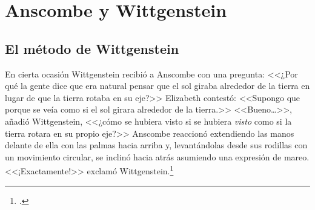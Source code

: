 

\section{Anscombe y Wittgenstein}



\subsection{El método de Wittgenstein}

En cierta ocasión Wittgenstein recibió a Anscombe con una pregunta: <<¿Por qué la
gente dice que era natural pensar que el sol giraba alrededor de la tierra en
lugar de que la tierra rotaba en su eje?>> Elizabeth contestó: <<Supongo que
porque se veía como si el sol girara alrededor de la tierra.>> <<Bueno\ldots>>,
añadió Wittgenstein, <<¿cómo se hubiera visto si se hubiera \emph{visto} como si
la tierra rotara en su propio eje?>> Anscombe reaccionó extendiendo las manos
delante de ella con las palmas hacia arriba y, levantándolas desde sus rodillas
con un movimiento circular, se inclinó hacia atrás asumiendo una expresión de
mareo. <<¡Exactamente!>> exclamó Wittgenstein.\footcite[cf.~][p.~151]{IWT}


